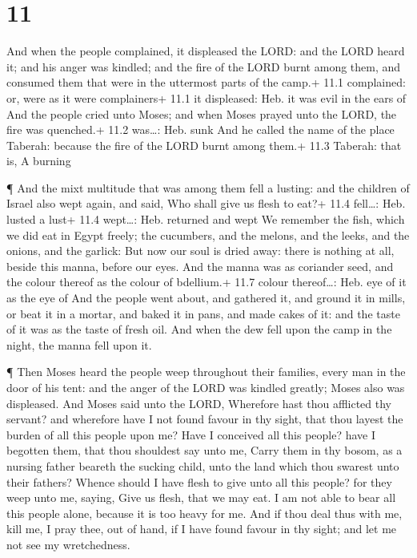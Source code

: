 \hypertarget{section-10}{%
\section{11}\label{section-10}}

 And when the people complained, it displeased the LORD: and
the LORD heard it; and his anger was kindled; and the fire of the LORD
burnt among them, and consumed them that were in the uttermost parts of
the camp.+ 11.1 complained: or, were as it were complainers+ 11.1 it
displeased: Heb. it was evil in the ears of  And the people
cried unto Moses; and when Moses prayed unto the LORD, the fire was
quenched.+ 11.2 was\ldots: Heb. sunk  And he called the name
of the place Taberah: because the fire of the LORD burnt among them.+
11.3 Taberah: that is, A burning

 ¶ And the mixt multitude that was among them fell a
lusting: and the children of Israel also wept again, and said, Who shall
give us flesh to eat?+ 11.4 fell\ldots: Heb. lusted a lust+ 11.4
wept\ldots: Heb. returned and wept  We remember the fish,
which we did eat in Egypt freely; the cucumbers, and the melons, and the
leeks, and the onions, and the garlick:  But now our soul is
dried away: there is nothing at all, beside this manna, before our eyes.
 And the manna was as coriander seed, and the colour thereof
as the colour of bdellium.+ 11.7 colour thereof\ldots: Heb. eye of it as
the eye of  And the people went about, and gathered it, and
ground it in mills, or beat it in a mortar, and baked it in pans, and
made cakes of it: and the taste of it was as the taste of fresh oil.
 And when the dew fell upon the camp in the night, the manna
fell upon it.

 ¶ Then Moses heard the people weep throughout their
families, every man in the door of his tent: and the anger of the LORD
was kindled greatly; Moses also was displeased.  And Moses
said unto the LORD, Wherefore hast thou afflicted thy servant? and
wherefore have I not found favour in thy sight, that thou layest the
burden of all this people upon me?  Have I conceived all
this people? have I begotten them, that thou shouldest say unto me,
Carry them in thy bosom, as a nursing father beareth the sucking child,
unto the land which thou swarest unto their fathers? 
Whence should I have flesh to give unto all this people? for they weep
unto me, saying, Give us flesh, that we may eat.  I am not
able to bear all this people alone, because it is too heavy for me.
 And if thou deal thus with me, kill me, I pray thee, out
of hand, if I have found favour in thy sight; and let me not see my
wretchedness.


